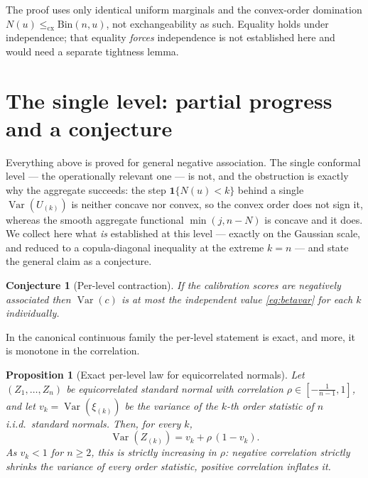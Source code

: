 \documentclass[11pt]{article}
\newtheorem{proposition}{Proposition}
\newtheorem{conjecture}{Conjecture}
\begin{document}
The proof uses only identical uniform marginals and the convex-order domination
$N(u)\le_{\mathrm{cx}}\mathrm{Bin}(n,u)$, not exchangeability as such. Equality holds under
independence; that equality \emph{forces} independence is not established here and would need a
separate tightness lemma.

\section{The single level: partial progress and a conjecture}

Everything above is proved for general negative association. The single conformal level --- the
operationally relevant one --- is not, and the obstruction is exactly why the aggregate succeeds: the
step $\mathbf 1\{N(u)<k\}$ behind a single $\operatorname{Var}(U_{(k)})$ is neither concave nor convex,
so the convex order does not sign it, whereas the smooth aggregate functional $\min(j,n-N)$ is concave
and it does. We collect here what \emph{is} established at this level --- exactly on the Gaussian scale,
and reduced to a copula-diagonal inequality at the extreme $k=n$ --- and state the general claim as a
conjecture.

\begin{conjecture}[Per-level contraction]\label{conj:disp}
If the calibration scores are negatively associated then $\operatorname{Var}(c)$ is at most the
independent value \eqref{eq:betavar} for each $k$ individually.
\end{conjecture}

In the canonical continuous family the per-level statement is exact, and more, it is monotone in the
correlation.

\begin{proposition}[Exact per-level law for equicorrelated normals]\label{prop:gauss}
Let $(Z_1,\dots,Z_n)$ be equicorrelated standard normal with correlation
$\rho\in[-\tfrac1{n-1},1]$, and let $v_k=\operatorname{Var}(\xi_{(k)})$ be the variance of the $k$-th
order statistic of $n$ i.i.d.\ standard normals. Then, for every $k$,
\begin{equation}
\operatorname{Var}(Z_{(k)})=v_k+\rho\,(1-v_k).
\end{equation}
As $v_k<1$ for $n\ge 2$, this is strictly increasing in $\rho$: negative correlation strictly shrinks
the variance of every order statistic, positive correlation inflates it.
\end{proposition}
\end{document}
